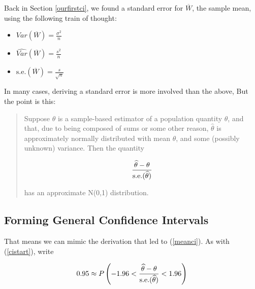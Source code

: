 Back in Section \ref{ourfirstci}, we found a standard error for
$\overline{W}$, the sample mean, using the following train of thought:

\begin{itemize}

\item $Var(\overline{W}) = \frac{\sigma^2}{n}$

\item $\widehat{Var}(\overline{W}) = \frac{s^2}{n}$

\item $\textrm{s.e.}(\overline{W}) = \frac{s}{\sqrt{n}}$

\end{itemize}

In many cases, deriving a standard error is more involved than the
above,  But the point is this:

\begin{quote}

Suppose $\widehat{\theta}$ is a sample-based estimator of a population
quantity $\theta$, and that, due to being composed of sums or some other
reason, $\widehat{\theta}$ is approximately normally distributed with
mean $\theta$, and some (possibly unknown) variance.  Then the quantity

\begin{equation}
\label{thetahatstderr}
\frac
{\widehat{\theta} - \theta}
{{\rm s.e.}(\widehat{\theta})}
\end{equation}

has an approximate N(0,1) distribution.

\end{quote}

\subsection{Forming General Confidence Intervals}

That means we can mimic the derivation that led to (\ref{meanci}).  As
with (\ref{cistart}), write

\begin{equation}
0.95 \approx P \left (-1.96 <  
\frac
{\widehat{\theta} - \theta}
{{\rm s.e.}(\widehat{\theta})}
< 1.96 \right )
\end{equation}

